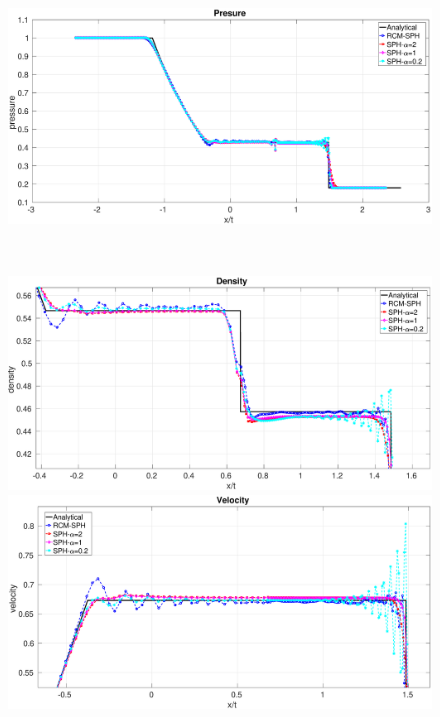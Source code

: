 \begin{figure}[htp]
\begin{minipage}{.495\textwidth}
    \end{minipage}%
    \begin{minipage}{.495 \textwidth}
        \centering
        \includegraphics[width=0.99 \textwidth]{Chapter-4/Figures/Sod/RCM-Sod-SPH-alf-p}
    \end{minipage}%
    \\
    \begin{minipage}{.495\textwidth}
        \centering
        \includegraphics[width=0.99 \textwidth]{Chapter-4/Figures/Sod/RCM-Sod-SPH-alf-rho-zoom}
    \end{minipage}%
    \begin{minipage}{.495 \textwidth}
        \centering
        \includegraphics[width=0.99 \textwidth]{Chapter-4/Figures/Sod/RCM-Sod-SPH-alf-v-zoom}

\end{minipage}
\end{figure}
